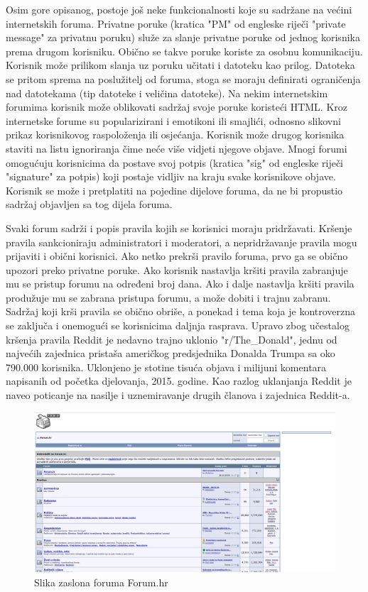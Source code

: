 \documentclass{foi}
\begin{document}
Osim gore opisanog, postoje još neke funkcionalnosti koje su sadržane na većini internetskih foruma. Privatne poruke (kratica "PM" od engleske riječi "private message" za privatnu poruku) služe za slanje privatne poruke od jednog korisnika prema drugom korisniku. Obično se takve poruke koriste za osobnu komunikaciju. Korisnik može prilikom slanja uz poruku učitati i datoteku kao prilog. Datoteka se pritom sprema na poslužitelj od foruma, stoga se moraju definirati ograničenja nad datotekama (tip datoteke i veličina datoteke). Na nekim internetskim forumima korisnik može oblikovati sadržaj svoje poruke koristeći HTML. Kroz internetske forume su popularizirani i emotikoni ili smajlići, odnosno slikovni prikaz korisnikovog raspoloženja ili osjećanja. Korisnik može drugog korisnika staviti na listu ignoriranja čime neće više vidjeti njegove objave. Mnogi forumi omogućuju korisnicima da postave svoj potpis (kratica "sig" od engleske riječi "signature" za potpis) koji postaje vidljiv na kraju svake korisnikove objave. Korisnik se može i pretplatiti na pojedine dijelove foruma, da ne bi propustio sadržaj objavljen sa tog dijela foruma.\cite{vbulletinhelp}

Svaki forum sadrži i popis pravila kojih se korisnici moraju pridržavati. Kršenje pravila sankcioniraju administratori i moderatori, a nepridržavanje pravila mogu prijaviti i obični korisnici. Ako netko prekrši pravilo foruma, prvo ga se obično upozori preko privatne poruke. Ako korisnik nastavlja kršiti pravila zabranjuje mu se pristup forumu na određeni broj dana. Ako i dalje nastavlja kršiti pravila produžuje mu se zabrana pristupa forumu, a može dobiti i trajnu zabranu. Sadržaj koji krši pravila se obično obriše, a ponekad i tema koja je kontroverzna se zaključa i onemogući se korisnicima daljnja rasprava. \cite{rules} Upravo zbog učestalog kršenja pravila Reddit je nedavno trajno uklonio "r/The\_Donald", jednu od najvećih zajednica pristaša američkog predsjednika Donalda Trumpa sa oko 790.000 korisnika. Uklonjeno je stotine tisuća objava i milijuni komentara napisanih od početka djelovanja, 2015. godine. Kao razlog uklanjanja Reddit je naveo poticanje na nasilje i uznemiravanje drugih članova i zajednica Reddit-a. \cite{bannedTheDonald}

\begin{figure}[h!]
    \centering
    \includegraphics[width=1\textwidth]{slike/forumhr.png}
    \caption{Slika zaslona foruma Forum.hr}
    \label{forumhr}
\end{figure}
\end{document}

